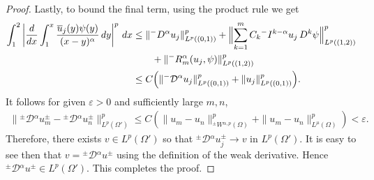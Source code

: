 \documentclass[leqno,final]{siamltex}
\numberwithin{equation}{section}
\newcommand{\eps}{\varepsilon}
\renewcommand{\(}{\bigl(}
\renewcommand{\)}{\bigr)}
\begin{document}
\begin{proof}
        Lastly,  to bound the final term, using the product rule we get 
        \begin{align*}
            \int_{1}^{2} \left|\dfrac{d}{dx} \int_{1}^{x} \dfrac{\overline{u}_{j} (y) \psi(y)}{(x-y)^{\alpha}}\,dy \right|^{p}\,dx 
            &\leq \|{^{-}}{D}{^{\alpha}} u_j \|_{L^{p}((0,1))}^{p} + \Bigl\|\sum_{k=1}^{m} C_{k} {^{-}}{I}{^{k-\alpha}}  u_j\, D^k   \psi \Bigr\|_{L^{p}((1,2))}^{p} \\
            &\qquad + \|{^{-}}{R}{^{\alpha}_{m}}(u_j,  \psi)\|_{L^{p}((1,2))}^{p} \\
            &\leq C \Bigl(\|{^{-}}{\mathcal{D}}{^{\alpha}} u_j\|_{L^{p}((0,1))}^{p} + \|u_j\|_{L^p((0,1))}^{p} \Bigr).
        \end{align*}
        It follows for given $\eps > 0$ and sufficiently large $m,n$, 
        \begin{align}
            \|{^{\pm}}{\mathcal{D}}{^{\alpha}} u_m^{\pm} - {^{\pm}}{\mathcal{D}}{^{\alpha}} u_n^{\pm} \|_{L^{p}(\Omega')}^{p} \leq C\left( \|u_m - u_n \|_{{^{\pm}}{W}{^{\alpha,p}}(\Omega)}^{p} + \| u_m - u_n \|_{L^{\mu}(\Omega)}^{p}\right) < \eps.
        \end{align}
        Therefore, there exists $v \in L^{p}(\Omega')$ so that ${^{\pm}}{\mathcal{D}}{^{\alpha}}u_j^{\pm} \rightarrow v$ in $L^{p}(\Omega')$. It is easy to see then that $v = {^{\pm}}{\mathcal{D}}{^{\alpha}} u^{\pm}$ using the definition of the weak derivative. Hence ${^{\pm}}{\mathcal{D}}{^{\alpha}}u^{\pm} \in L^{p}(\Omega')$. This completes the proof. 
    \end{proof}
\end{document}
